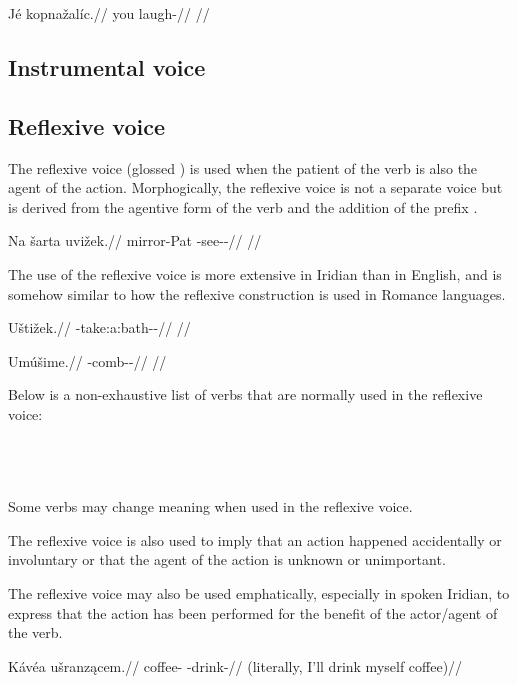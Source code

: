 \pex
\begingl
\gla Jé kopnažalíc.//
\glb you laugh-//
\glft {}//
\endgl
\xe

\subsection{Instrumental voice}


\subsection{Reflexive voice}

The reflexive voice (glossed {\Refl}) is used when the patient of the verb is also the agent of the action. Morphogically, the reflexive voice is not a separate voice but is derived from the agentive form of the verb and the addition of the prefix .

\pex
\begingl
\gla Na šarta uvižek.//
\glb \Loc{} mirror-Pat{} \Refl{}-see-\Av{}-\Pf{}//
\glft {}//
\endgl
\xe

The use of the reflexive voice is more extensive in Iridian than in English, and is somehow similar to how the reflexive construction is used in Romance languages.

\pex
\begingl
\gla Uštižek.//
\glb \Refl{}-take:a:bath-\Av{}-\Pf{}//
\glft {}//
\endgl
\xe

\pex
\begingl
\gla Umúšime.//
\glb \Refl{}-comb-\Av{}-\Prog{}//
\glft {}//
\endgl
\xe

Below is a non-exhaustive list of verbs that are normally used in the reflexive voice:
\bigskip

\noindent
{} \\
 \\
 \\

Some verbs may change meaning when used in the reflexive voice.


The reflexive voice is also used to imply that an action happened accidentally or involuntary or that the agent of the action is unknown or unimportant.

The reflexive voice may also be used emphatically, especially in spoken Iridian, to express that the action has been performed for the benefit of the actor/agent of the verb.

\pex
\begingl
\gla Kávéa ušranz\k{a}cem.//
\glb coffee-\Acc{} \Refl{}-drink-//
\glft {} (literally, I'll drink myself coffee)//
\endgl
\xe

